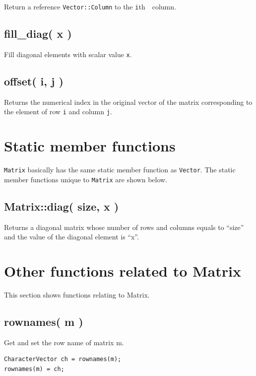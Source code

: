 \documentclass[]{book}
\theoremstyle{definition}
\theoremstyle{definition}
\theoremstyle{remark}
\begin{document}
Return a reference \texttt{Vector::Column} to the \texttt{i}th　column.

\subsection{fill\_diag( x )}\label{fill_diag-x}

Fill diagonal elements with scalar value \texttt{x}.

\subsection{offset( i, j )}\label{offset-i-j}

Returns the numerical index in the original vector of the matrix
corresponding to the element of row \texttt{i} and column \texttt{j}.

\section{Static member functions}\label{static-member-functions-1}

\texttt{Matrix} basically has the same static member function as
\texttt{Vector}. The static member functions unique to \texttt{Matrix}
are shown below.

\subsection{Matrix::diag( size, x )}\label{matrixdiag-size-x}

Returns a diagonal matrix whose number of rows and columns equals to
``size'' and the value of the diagonal element is ``x''.

\section{Other functions related to
Matrix}\label{other-functions-related-to-matrix}

This section shows functions relating to Matrix.

\subsection{rownames( m )}\label{rownames-m}

Get and set the row name of matrix m.

\begin{verbatim}
CharacterVector ch = rownames(m);
rownames(m) = ch;
\end{verbatim}
\end{document}
